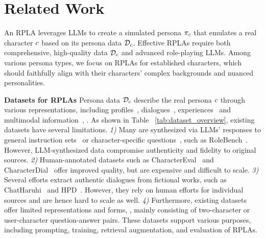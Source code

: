 \section{Related Work}



An RPLA leverages LLMs to create a simulated persona $\pi_c$ that emulates a real character $c$ based on its persona data $\mathcal{D}_c$. 
Effective RPLAs require both comprehensive, high-quality data $\mathcal{D}_c$ and advanced role-playing LLMs.
Among various persona types, we focus on RPLAs for established characters, which should faithfully align with their characters’ complex backgrounds and nuanced personalities. 


\textbf{Datasets for RPLAs} \quad 
Persona data $\mathcal{D}_c$ describe the real persona $c$ through various representations, including profiles~\citep{yuan2024evaluating}, dialogues~\citep{wang2023rolellm}, experiences~\citep{li2023chatharuhi} and multimodal information~\citep{dai2024mmrolecomprehensiveframeworkdeveloping}, \etc. 
As shown in Table ~\ref{tab:dataset_overview}, existing datasets have several limitations. 
\textit{1)} Many are synthesized via LLMs' responses to general instruction sets~\citep{wang2023rolellm} or character-specific questions~\citep{shao2023character}, such as RoleBench~\citep{wang2023rolellm}.  
However, LLM-synthesized data compromise authenticity and fidelity to original sources.
\textit{2)} Human-annotated datasets such as CharacterEval~\citep{tu2024charactereval} and CharacterDial~\citep{zhou2023characterglm} offer improved quality, but are expensive and difficult to scale.
\textit{3)} Several efforts extract authentic dialogues from fictional works, such as ChatHaruhi~\citep{li2023chatharuhi} and HPD~\citep{chen2023large}. However, they rely on human efforts for individual sources and are hence hard to scale as well.
\textit{4)} Furthermore, existing datasets offer limited representations and forms, \ie, mainly consisting of two-character or user-character question-answer pairs.
These datasets support various purposes, including prompting, training, retrieval augmentation, and evaluation of RPLAs.


